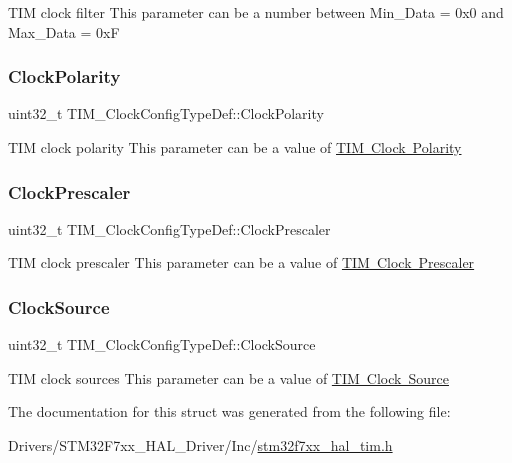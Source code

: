 T\+IM clock filter This parameter can be a number between Min\+\_\+\+Data = 0x0 and Max\+\_\+\+Data = 0xF \mbox{\label{struct_t_i_m___clock_config_type_def_a66453fa8dc8a300267ff5aba08eff5c4}} 
\subsubsection{\texorpdfstring{ClockPolarity}{ClockPolarity}}
{\footnotesize\ttfamily uint32\+\_\+t T\+I\+M\+\_\+\+Clock\+Config\+Type\+Def\+::\+Clock\+Polarity}

T\+IM clock polarity This parameter can be a value of \mbox{\hyperlink{group___t_i_m___clock___polarity}{T\+IM Clock Polarity}} \mbox{\label{struct_t_i_m___clock_config_type_def_ae4c0cb6f58da0ec7b99f1c6411d2fee1}} 
\subsubsection{\texorpdfstring{ClockPrescaler}{ClockPrescaler}}
{\footnotesize\ttfamily uint32\+\_\+t T\+I\+M\+\_\+\+Clock\+Config\+Type\+Def\+::\+Clock\+Prescaler}

T\+IM clock prescaler This parameter can be a value of \mbox{\hyperlink{group___t_i_m___clock___prescaler}{T\+IM Clock Prescaler}} \mbox{\label{struct_t_i_m___clock_config_type_def_a54c329013b5f6f87d1c3d2495fca84d2}} 
\subsubsection{\texorpdfstring{ClockSource}{ClockSource}}
{\footnotesize\ttfamily uint32\+\_\+t T\+I\+M\+\_\+\+Clock\+Config\+Type\+Def\+::\+Clock\+Source}

T\+IM clock sources This parameter can be a value of \mbox{\hyperlink{group___t_i_m___clock___source}{T\+IM Clock Source}} 

The documentation for this struct was generated from the following file\+:\begin{DoxyCompactItemize}
\item 
Drivers/\+S\+T\+M32\+F7xx\+\_\+\+H\+A\+L\+\_\+\+Driver/\+Inc/\mbox{\hyperlink{stm32f7xx__hal__tim_8h}{stm32f7xx\+\_\+hal\+\_\+tim.\+h}}\end{DoxyCompactItemize}
